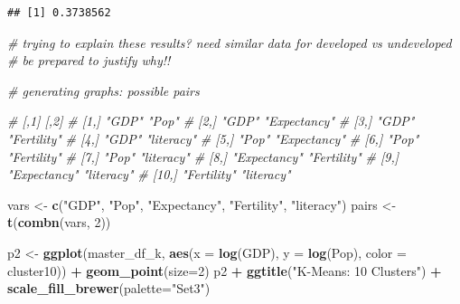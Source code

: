 \documentclass[]{article}
\newenvironment{Shaded}{\begin{snugshade}}{\end{snugshade}}
\newcommand{\CommentTok}[1]{\textcolor[rgb]{0.56,0.35,0.01}{\textit{#1}}}
\newcommand{\DataTypeTok}[1]{\textcolor[rgb]{0.13,0.29,0.53}{#1}}
\newcommand{\DecValTok}[1]{\textcolor[rgb]{0.00,0.00,0.81}{#1}}
\newcommand{\KeywordTok}[1]{\textcolor[rgb]{0.13,0.29,0.53}{\textbf{#1}}}
\newcommand{\NormalTok}[1]{#1}
\newcommand{\OperatorTok}[1]{\textcolor[rgb]{0.81,0.36,0.00}{\textbf{#1}}}
\newcommand{\StringTok}[1]{\textcolor[rgb]{0.31,0.60,0.02}{#1}}
\begin{document}
\begin{verbatim}
## [1] 0.3738562
\end{verbatim}

\begin{Shaded}
\begin{Highlighting}[]
\CommentTok{# trying to explain these results? need similar data for developed vs undeveloped}
\CommentTok{# be prepared to justify why!!}
\end{Highlighting}
\end{Shaded}

\begin{Shaded}
\begin{Highlighting}[]
\CommentTok{# generating graphs: possible pairs}

\CommentTok{#       [,1]         [,2]        }
\CommentTok{#  [1,] "GDP"        "Pop"       }
\CommentTok{#  [2,] "GDP"        "Expectancy"}
\CommentTok{#  [3,] "GDP"        "Fertility" }
\CommentTok{#  [4,] "GDP"        "literacy"  }
\CommentTok{#  [5,] "Pop"        "Expectancy"}
\CommentTok{#  [6,] "Pop"        "Fertility" }
\CommentTok{#  [7,] "Pop"        "literacy"  }
\CommentTok{#  [8,] "Expectancy" "Fertility" }
\CommentTok{#  [9,] "Expectancy" "literacy"  }
\CommentTok{# [10,] "Fertility"  "literacy"  }

\NormalTok{vars <-}\StringTok{ }\KeywordTok{c}\NormalTok{(}\StringTok{"GDP"}\NormalTok{, }\StringTok{"Pop"}\NormalTok{, }\StringTok{"Expectancy"}\NormalTok{, }\StringTok{"Fertility"}\NormalTok{, }\StringTok{"literacy"}\NormalTok{)}
\NormalTok{pairs <-}\StringTok{ }\KeywordTok{t}\NormalTok{(}\KeywordTok{combn}\NormalTok{(vars, }\DecValTok{2}\NormalTok{))}

\NormalTok{p2 <-}\StringTok{ }\KeywordTok{ggplot}\NormalTok{(master_df_k, }\KeywordTok{aes}\NormalTok{(}\DataTypeTok{x =} \KeywordTok{log}\NormalTok{(GDP), }\DataTypeTok{y =} \KeywordTok{log}\NormalTok{(Pop), }\DataTypeTok{color =}\NormalTok{ cluster10)) }\OperatorTok{+}
\StringTok{  }\KeywordTok{geom_point}\NormalTok{(}\DataTypeTok{size=}\DecValTok{2}\NormalTok{)}
\NormalTok{p2 }\OperatorTok{+}\StringTok{ }\KeywordTok{ggtitle}\NormalTok{(}\StringTok{"K-Means: 10 Clusters"}\NormalTok{) }\OperatorTok{+}\StringTok{ }\KeywordTok{scale_fill_brewer}\NormalTok{(}\DataTypeTok{palette=}\StringTok{"Set3"}\NormalTok{)}
\end{Highlighting}
\end{Shaded}
\end{document}
